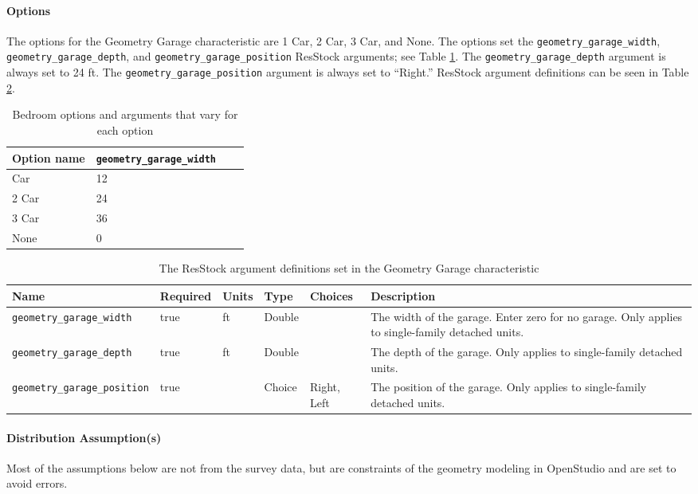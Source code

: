 \paragraph{Options}
The options for the Geometry Garage characteristic are 1 Car, 2 Car, 3 Car, and None. The options set the \texttt{geometry\_garage\_width}, \texttt{geometry\_garage\_depth}, and \texttt{geometry\_garage\_position} ResStock arguments; see Table \ref{table:hc_opt_garage}. The \texttt{geometry\_garage\_depth} argument is always set to 24 ft. The \texttt{geometry\_garage\_position} argument is always set to ``Right.'' ResStock argument definitions can be seen in Table \ref{table:hc_arg_def_garage}.

\begin{longtable}[]{ |p{}|p{4cm}|p{4cm}|p{4cm}| }
\caption{Bedroom options and arguments that vary for each option} \label{table:hc_opt_garage} \\
\toprule\noalign{}
Option name & \texttt{geometry\_garage\_width} \\
\midrule\noalign{}
\endhead
\bottomrule\noalign{}
\endlastfoot
1 Car & 12 \\
\hline
2 Car & 24 \\
\hline
3 Car & 36 \\
\hline
None & 0 \\
\end{longtable}

\begin{longtable}[]{ |p{}|p{1.5cm}|p{1cm}|p{1.1cm}|p{1.4cm}|p{6cm}| }
\caption{The ResStock argument definitions set in the Geometry Garage characteristic} \label{table:hc_arg_def_garage} \\
\toprule\noalign{}
Name & Required & Units & Type & Choices & Description \\
\midrule\noalign{}
\endhead
\bottomrule\noalign{}
\endlastfoot
\texttt{geometry\_garage\_width} & true & ft & Double & & The width of
the garage. Enter zero for no garage. Only applies to single-family
detached units. \\
\hline
\texttt{geometry\_garage\_depth} & true & ft & Double & & The depth of
the garage. Only applies to single-family detached units. \\
\hline
\texttt{geometry\_garage\_position} & true & & Choice & Right, Left &
The position of the garage. Only applies to single-family detached
units. \\
\end{longtable}

\paragraph{Distribution Assumption(s)}
Most of the assumptions below are not from the survey data, but are constraints of the geometry modeling in OpenStudio and are set to avoid errors.

